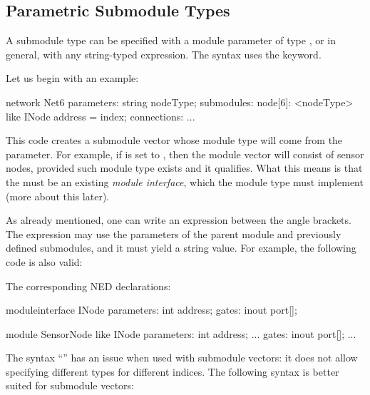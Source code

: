 \subsection{Parametric Submodule Types}
\label{sec:ned-lang:submodule-like}

A submodule type can be specified with a module parameter of type
, or in general, with any string-typed expression. The syntax
uses the  keyword.

Let us begin with an example:

\begin{ned}
network Net6
{
    parameters:
        string nodeType;
    submodules:
        node[6]: <nodeType> like INode {
            address = index;
        }
    connections:
        ...
}
\end{ned}

This code creates a submodule vector whose module type will come from the
 parameter. For example, if  is set to ,
then the module vector will consist of sensor nodes, provided such module
type exists and it qualifies. What this means is that the  must be
an existing \textit{module interface}, which the 
module type must implement (more about this later).

As already mentioned, one can write an expression between the angle brackets.
The expression may use the parameters of the parent module and previously
defined submodules, and it must yield a string value. For example, the following
code is also valid:

\begin{ned}
network Net6
{
    parameters:
        string nodeTypePrefix;
        int variant;
    submodules:
        node[6]: <nodeTypePrefix + "Node" + string(variant)> like INode {
           ...
}
\end{ned}

The corresponding NED declarations:

\begin{ned}
moduleinterface INode
{
    parameters:
        int address;
    gates:
        inout port[];
}

module SensorNode like INode
{
    parameters:
        int address;
        ...
    gates:
        inout port[];
        ...
}
\end{ned}

The syntax ``'' has an issue when used with submodule
vectors: it does not allow specifying different types for different indices. The
following syntax is better suited for submodule vectors:

